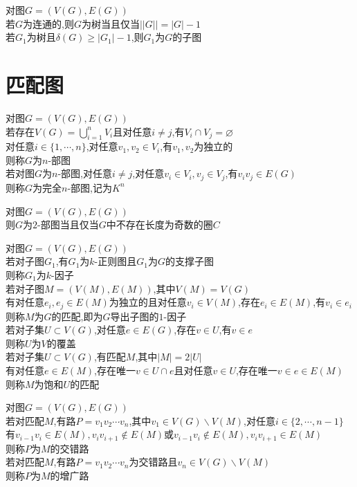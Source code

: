\begin{dingli}
对图$G=(V(G),E(G))$\\
若$G$为连通的,则$G$为树当且仅当$||G||=|G|-1$\\
若$G_1$为树且$\delta(G)\geq|G_1|-1$,则$G_1$为$G$的子图
\end{dingli}

\chapter{匹配图}

\begin{dingyi}
对图$G=(V(G),E(G))$\\
若存在$V(G)=\bigcup\limits_{i=1}^{n}V_i$且对任意$i\neq j$,有$V_i\cap V_j=\varnothing$\\
对任意$i\in\{1,\cdots,n\}$,对任意$v_1,v_2\in V_i$,有$v_1,v_2$为独立的\\
则称$G$为$n$-部图\\
若对图$G$为$n$-部图,对任意$i\neq j$,对任意$v_i\in V_i,v_j\in V_j$,有$v_iv_j\in E(G)$\\
则称$G$为完全$n$-部图,记为$K^{n}$
\end{dingyi}

\begin{dingli}
对图$G=(V(G),E(G))$\\
则$G$为$2$-部图当且仅当$G$中不存在长度为奇数的圈$C$
\end{dingli}

\begin{dingyi}
对图$G=(V(G),E(G))$\\
若对子图$G_1$,有$G_1$为$k$-正则图且$G_1$为$G$的支撑子图\\
则称$G_1$为$k$-因子\\
若对子图$M=(V(M),E(M))$,其中$V(M)=V(G)$\\
有对任意$e_i,e_j\in E(M)$为独立的且对任意$v_i\in V(M)$,存在$e_i\in E(M)$,有$v_i\in e_i$\\
则称$M$为$G$的匹配,即为$G$导出子图的$1$-因子\\
若对子集$U\subset V(G)$,对任意$e\in E(G)$,存在$v\in U$,有$v\in e$\\
则称$U$为$V$的覆盖\\
若对子集$U\subset V(G)$,有匹配$M$,其中$|M|=2|U|$\\
有对任意$e\in E(M)$,存在唯一$v\in U\cap e$且对任意$v\in U$,存在唯一$v\in e\in E(M)$\\
则称$M$为饱和$U$的匹配
\end{dingyi}

\begin{dingyi}
对图$G=(V(G),E(G))$\\
若对匹配$M$,有路$P=v_1v_2\cdots v_n$,其中$v_1\in V(G)\backslash V(M)$,对任意$i\in\{2,\cdots,n-1\}$\\
有$v_{i-1}v_i\in E(M),v_iv_{i+1}\notin E(M)$或$v_{i-1}v_i\notin E(M),v_iv_{i+1}\in E(M)$\\
则称$P$为$M$的交错路\\
若对匹配$M$,有路$P=v_1v_2\cdots v_n$为交错路且$v_n\in V(G)\backslash V(M)$\\
则称$P$为$M$的增广路
\end{dingyi}

